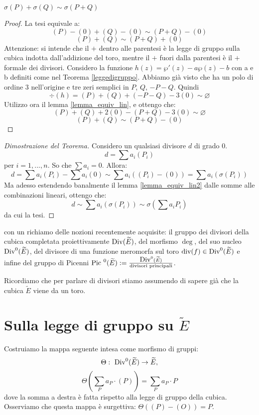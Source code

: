 \begin{lemma}
  \label{lemma_equiv_lin2}
$\sigma(P)+\sigma(Q) \sim \sigma (P+Q)$
\end{lemma}
\begin{proof}
La tesi equivale a:
$$(P)-(0)+(Q)-(0) \sim (P+Q)-(0)$$
$$(P)+(Q)\sim (P+Q)+(0)$$
Attenzione: si intende che il $+$ dentro alle parentesi è la legge di gruppo sulla cubica indotta dall'addizione del toro, mentre il $+$ fuori dalla parentesi è il $+$ formale dei divisori.
Considero la funzione $h(z) = \wp'(z) - a \wp(z) - b$ con a e b definiti come nel Teorema \ref{leggedigruppo}. Abbiamo già visto che ha un polo di ordine $3$ nell'origine e tre zeri semplici in $P$, $Q$, $-P-Q$. Quindi $$\div(h)=(P)+(Q)+(-P-Q)-3(0) \sim \varnothing$$
Utilizzo ora il lemma \ref{lemma_equiv_lin}, e ottengo che:
$$(P)+(Q)+2(0)-(P+Q)-3(0) \sim \varnothing$$
$$(P)+(Q) \sim (P+Q)-(0)$$
\end{proof}

\begin{proof}[Dimostrazione del Teorema]
Considero un qualsiasi divisore $d$ di grado $0$.
$$d=\sum a_i (P_i)$$
per $i=1,...,n$. So che $\sum a_i=0$. Allora:
$$d = \sum a_i (P_i)-\sum a_i (0) \sim \sum a_i ((P_i)-(0))=\sum a_i (\sigma(P_i))$$
Ma adesso estendendo banalmente il lemma \ref{lemma_equiv_lin2} dalle somme alle combinazioni lineari, ottengo che:
$$d \sim \sum a_i (\sigma(P_i)) \sim \sigma(\sum a_i P_i)$$
da cui la tesi.
\end{proof}


 con un richiamo delle nozioni recentemente acquisite: il gruppo dei divisori della cubica completata proiettivamente $\mbox{Div}(\widetilde{E})$, del morfismo $\deg$, del suo nucleo $\mbox{Div}^0(\widetilde{E})$, del divisore di una funzione meromorfa sul toro $\mbox{div}(f)\in\mbox{Div}^0(\widetilde{E})$ e infine del gruppo di Picenni $\mbox{Pic }^0(\widetilde{E}) := \frac{\mbox{Div}^0(\widetilde{E})}{\text{divisori principali}}$.

Ricordiamo che per parlare di divisori stiamo assumendo di sapere già che la cubica $\widetilde{E}$ viene da un toro.

\section{Sulla legge di gruppo su $\widetilde{E}$}
Costruiamo la mappa seguente intesa come morfismo di gruppi:
$$
\Theta: \ \mbox{Div}^0(\widetilde{E})\rightarrow \widetilde{E},
$$
$$
\Theta\left(\sum_P a_P \cdot (P)\right)=\sum_P a_P \cdot P
$$
dove la somma a destra è fatta rispetto alla legge di gruppo della cubica.
Osserviamo che questa mappa è surgettiva: $\Theta((P)-(O))=P$.

